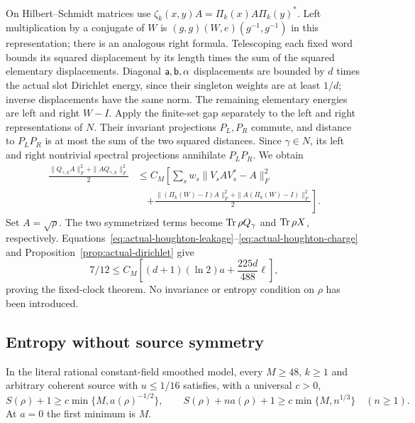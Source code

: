 On Hilbert--Schmidt matrices use
$\zeta_k(x,y)A=\Pi_k(x)A\Pi_k(y)^*$.
Left multiplication by a conjugate of $W$ is
$(g,g)(W,e)(g^{-1},g^{-1})$ in this representation;
there is an analogous right formula.
Telescoping each fixed word bounds its squared displacement by
its length times the sum of the squared elementary displacements.
Diagonal $\mathsf a,\mathsf b,\alpha$ displacements are bounded by $d$ times
the actual slot Dirichlet energy, since their singleton weights
are at least $1/d$; inverse displacements have the same norm.
The remaining elementary energies are left and right $W-I$.
Apply the finite-set gap separately to the left and right
representations of $N$. Their invariant projections $P_L,P_R$
commute, and distance to $P_LP_R$ is at most the sum of the two
squared distances. Since $\gamma\in N$, its left and right
nontrivial spectral projections annihilate $P_LP_R$. We obtain
\begin{equation}\label{eq:fixed-clock-operator}
 \begin{aligned}
 \frac{\|Q_{\gamma,k}A\|_F^2+\|AQ_{\gamma,k}\|_F^2}{2}
 &\leq C_M\left[\sum_sw_s\|V_sAV_s^*-A\|_F^2\right.\\
 &\quad\left.+
 \frac{\|(\Pi_k(W)-I)A\|_F^2+\|A(\Pi_k(W)-I)\|_F^2}{2}
 \right].
 \end{aligned}
\end{equation}
Set $A=\sqrt\rho$. The two symmetrized terms become
$\operatorname{Tr}\rho Q_\gamma$ and $\operatorname{Tr}\rho X$, respectively.
Equations~\eqref{eq:actual-houghton-leakage}--\eqref{eq:actual-houghton-charge}
and Proposition~\ref{prop:actual-dirichlet} give
\[
 7/12\leq C_M\left[(d+1)(\ln2)a+
                      \frac{225d}{488}\ell\right],
\]
proving the fixed-clock theorem. No invariance or entropy condition
on $\rho$ has been introduced.

\subsection{Entropy without source symmetry}

\begin{theorem}\label{thm:houghton-entropy}
In the literal rational constant-field smoothed model, every $M\geq48$,
$k\geq1$ and arbitrary coherent source with $u\leq1/16$ satisfies,
with a universal $c>0$,
\[
 S(\rho)+1\geq c\min\{M,a(\rho)^{-1/2}\},\qquad
 S(\rho)+na(\rho)+1\geq c\min\{M,n^{1/3}\}\quad(n\geq1).
\]
At $a=0$ the first minimum is $M$.
\end{theorem}

